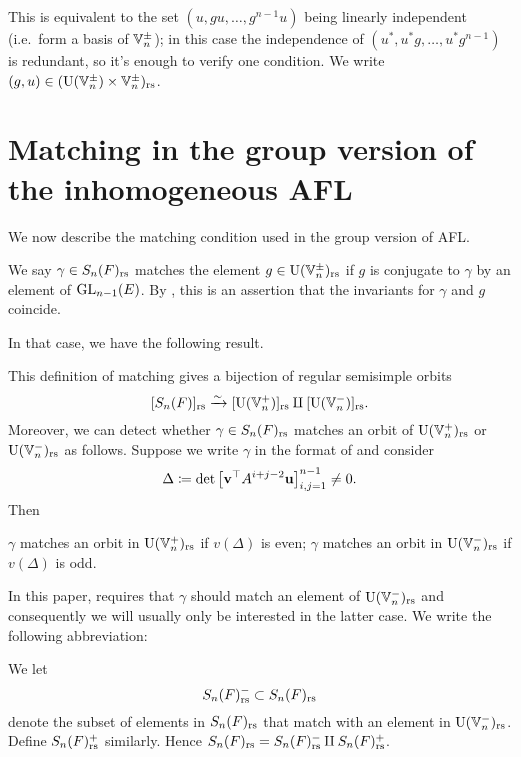\begin{definition}
\begin{itemize}
    This is equivalent to the set $\left(  u, gu, \dots, g^{n-1}u \right)$
    being linearly independent (i.e.\ form a basis of $\mathbb V_n^\pm$);
    in this case the independence of $\left( u^\ast, u^\ast g, \dots, u^\ast g^{n-1} \right)$
    is redundant, so it's enough to verify one condition.
    We write $(g,u) \in (\operatorname{U}(\mathbb V_n^\pm) \times \mathbb V_n^\pm)_{\mathrm{rs}}$.
  \end{itemize}
  \label{def:regular}
\end{definition}

\section{Matching in the group version of the inhomogeneous AFL}
We now describe the matching condition used in the group version of AFL.
\begin{definition}
  We say $\gamma \in S_n(F)_{\mathrm{rs}}$ matches the element $g \in \operatorname{U}(\mathbb V_n^\pm)_{\mathrm{rs}}$
  if $g$ is conjugate to $\gamma$ by an element of $\operatorname{GL}_{n-1}(E)$.
  By , this is an assertion that
  the invariants for $\gamma$ and $g$ coincide.
  \label{def:matching_inhomog}
\end{definition}
In that case, we have the following result.
\begin{proposition}
  \label{prop:valuation_delta_matching_group}
  This definition of matching gives
  a bijection of regular semisimple orbits
  \[ [S_n(F)]_{\mathrm{rs}} \xrightarrow{\sim} [\operatorname{U}(\mathbb V_n^+)]_{\mathrm{rs}} \amalg [\operatorname{U}(\mathbb V_n^-)]_{\mathrm{rs}}. \]
  Moreover, we can detect whether $\gamma \in S_n(F)_{\mathrm{rs}}$ matches an orbit of
  $\operatorname{U}(\mathbb V_n^+)_{\mathrm{rs}}$ or $\operatorname{U}(\mathbb V_n^-)_{\mathrm{rs}}$ as follows.
  Suppose we write $\gamma$ in the format of  and consider
  \[ \Delta \coloneqq \det \left[ \mathbf v^\top A^{i+j-2} \mathbf u \right]_{i,j=1}^{n-1} \neq 0. \]
  Then
  \begin{itemize}
    \ii $\gamma$ matches an orbit in $\operatorname{U}(\mathbb V_n^+)_{\mathrm{rs}}$ if $v(\Delta)$ is even;
    \ii $\gamma$ matches an orbit in $\operatorname{U}(\mathbb V_n^-)_{\mathrm{rs}}$ if $v(\Delta)$ is odd.
  \end{itemize}
\end{proposition}
In this paper, 
requires that $\gamma$ should match an element of $\operatorname{U}(\mathbb V_n^-)_{\mathrm{rs}}$
and consequently we will usually only be interested in the latter case.
We write the following abbreviation:
\begin{definition}
  [$S_n(F)\rs^\pm$]
  We let \[ S_n(F)_{\mathrm{rs}}^- \subset S_n(F)_{\mathrm{rs}} \]
  denote the subset of elements in $S_n(F)_{\mathrm{rs}}$ that match
  with an element in $\operatorname{U}(\mathbb V_n^-)_{\mathrm{rs}}$.
  Define $S_n(F)_{\mathrm{rs}}^+$ similarly.
  Hence $S_n(F)_{\mathrm{rs}} = S_n(F)_{\mathrm{rs}}^- \amalg S_n(F)_{\mathrm{rs}}^+$.
\end{definition}


